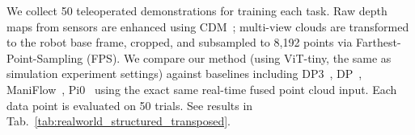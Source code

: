\documentclass[runningheads]{llncs}
\begin{document}


We collect 50 teleoperated demonstrations for training each task. Raw depth maps from sensors are enhanced using CDM~\cite{liu2025manipulation}; multi-view clouds are transformed to the robot base frame, cropped, and subsampled to 8,192 points via Farthest-Point-Sampling (FPS). We compare our method (using ViT-tiny, the same as simulation experiment settings) against baselines including DP3~\cite{ze20243d}, DP~\cite{chi2024diffusionpolicyvisuomotorpolicy}, ManiFlow~\cite{yan2025maniflowgeneralrobotmanipulation}, Pi0~\cite{black2024pi_0} using the exact same real-time fused point cloud input. Each data point is evaluated on 50 trials. See results in Tab.~\ref{tab:realworld_structured_transposed}.
\vspace{-1em}
\end{document}
